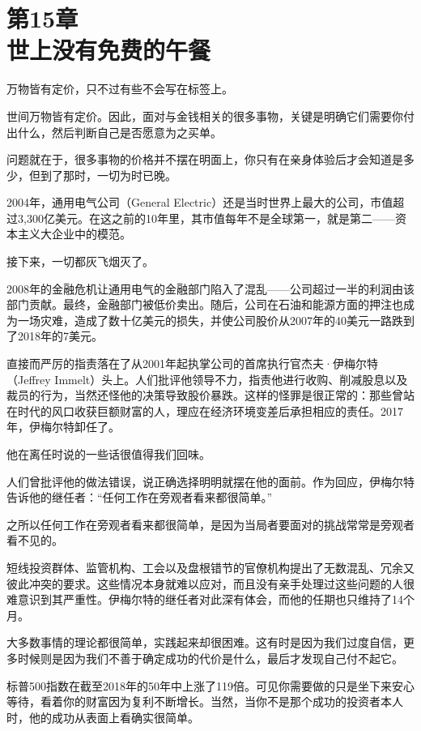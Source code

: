 
\section[第15章\q 世上没有免费的午餐]{第15章\\ 世上没有免费的午餐}

{\kaishu

万物皆有定价，只不过有些不会写在标签上。

}

世间万物皆有定价。因此，面对与金钱相关的很多事物，关键是明确它们需要你付出什么，然后判断自己是否愿意为之买单。

问题就在于，很多事物的价格并不摆在明面上，你只有在亲身体验后才会知道是多少，但到了那时，一切为时已晚。

2004年，通用电气公司（General Electric）还是当时世界上最大的公司，市值超过3,300亿美元。在这之前的10年里，其市值每年不是全球第一，就是第二——资本主义大企业中的模范。

接下来，一切都灰飞烟灭了。

2008年的金融危机让通用电气的金融部门陷入了混乱——公司超过一半的利润由该部门贡献。最终，金融部门被低价卖出。随后，公司在石油和能源方面的押注也成为一场灾难，造成了数十亿美元的损失，并使公司股价从2007年的40美元一路跌到了2018年的7美元。

直接而严厉的指责落在了从2001年起执掌公司的首席执行官杰夫·伊梅尔特（Jeffrey Immelt）头上。人们批评他领导不力，指责他进行收购、削减股息以及裁员的行为，当然还怪他的决策导致股价暴跌。这样的怪罪是很正常的：那些曾站在时代的风口收获巨额财富的人，理应在经济环境变差后承担相应的责任。2017年，伊梅尔特卸任了。

他在离任时说的一些话很值得我们回味。

人们曾批评他的做法错误，说正确选择明明就摆在他的面前。作为回应，伊梅尔特告诉他的继任者：“任何工作在旁观者看来都很简单。”

之所以任何工作在旁观者看来都很简单，是因为当局者要面对的挑战常常是旁观者看不见的。

短线投资群体、监管机构、工会以及盘根错节的官僚机构提出了无数混乱、冗余又彼此冲突的要求。这些情况本身就难以应对，而且没有亲手处理过这些问题的人很难意识到其严重性。伊梅尔特的继任者对此深有体会，而他的任期也只维持了14个月。

大多数事情的理论都很简单，实践起来却很困难。这有时是因为我们过度自信，更多时候则是因为我们不善于确定成功的代价是什么，最后才发现自己付不起它。

标普500指数在截至2018年的50年中上涨了119倍。可见你需要做的只是坐下来安心等待，看着你的财富因为复利不断增长。当然，当你不是那个成功的投资者本人时，他的成功从表面上看确实很简单。

